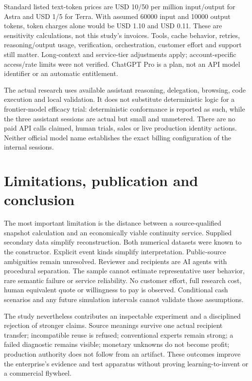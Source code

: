 Standard listed text-token prices are USD 10/50 per million input/output for Astra and USD 1/5 for Terra. With assumed 60000 input and 10000 output tokens, token charges alone would be USD 1.10 and USD 0.11. These are sensitivity calculations, not this study's invoices. Tools, cache behavior, retries, reasoning/output usage, verification, orchestration, customer effort and support still matter. Long-context and service-tier adjustments apply; account-specific access/rate limits were not verified. ChatGPT Pro is a plan, not an API model identifier or an automatic entitlement.\citep{astra,terra,pricing}

The actual research uses available assistant reasoning, delegation, browsing, code execution and local validation. It does not substitute deterministic logic for a frontier-model efficacy trial: deterministic conformance is reported as such, while the three assistant sessions are actual but small and unmetered. There are no paid API calls claimed, human trials, sales or live production identity actions. Neither official model name establishes the exact billing configuration of the internal sessions.

\section{Limitations, publication and conclusion}

The most important limitation is the distance between a source-qualified snapshot calculation and an economically viable continuity service. Supplied secondary data simplify reconstruction. Both numerical datasets were known to the constructor. Explicit event kinds simplify interpretation. Public-source ambiguities remain unresolved. Reviewer and recipients are AI agents with procedural separation. The sample cannot estimate representative user behavior, rare semantic failure or service reliability. No customer effort, full research cost, human equivalent quote or willingness to pay is observed. Conditional cash scenarios and any future simulation intervals cannot validate those assumptions.

The study nevertheless contributes an inspectable experiment and a disciplined rejection of stronger claims. Source meanings survive one actual recipient transfer; incompatible reuse is refused; conventional experts remain strong; a failed diagnostic remains visible; monetary unknowns do not become profit; production authority does not follow from an artifact. These outcomes improve the enterprise's evidence and test apparatus without proving learning-to-invent or a commercial flywheel.

